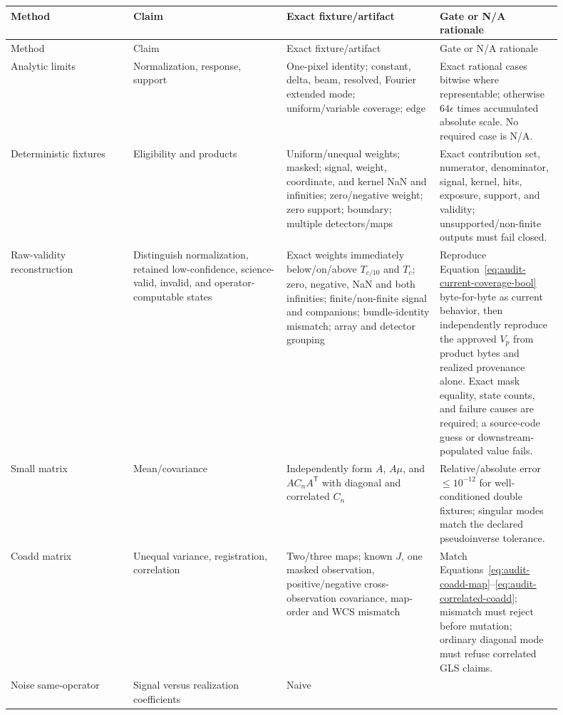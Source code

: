\documentclass[11pt]{article}
\begin{document}
\begin{longtable}{L{0.20\linewidth}L{0.25\linewidth}L{0.25\linewidth}L{0.20\linewidth}}
\toprule
Method & Claim & Exact fixture/artifact & Gate or N/A rationale\\
\midrule
\endfirsthead
\toprule
Method & Claim & Exact fixture/artifact & Gate or N/A rationale\\
\midrule
\endhead
Analytic limits & Normalization, response, support & One-pixel identity;
constant, delta, beam, resolved, Fourier extended mode; uniform/variable
coverage; edge & Exact rational cases bitwise where representable; otherwise
\(64\epsilon\) times accumulated absolute scale.  No required case is N/A.\\
Deterministic fixtures & Eligibility and products & Uniform/unequal weights;
masked; signal, weight, coordinate, and kernel NaN and infinities; zero/negative
weight; zero support; boundary; multiple detectors/maps & Exact contribution
set, numerator, denominator, signal, kernel, hits, exposure, support, and validity;
unsupported/non-finite outputs must fail closed.\\
Raw-validity reconstruction & Distinguish normalization, retained
low-confidence, science-valid, invalid, and operator-computable states & Exact
weights immediately below/on/above \(T_{c/10}\) and \(T_c\); zero, negative,
NaN and both infinities; finite/non-finite signal and companions; bundle-identity
mismatch; array and detector grouping & Reproduce
Equation~\eqref{eq:audit-current-coverage-bool} byte-for-byte as current
behavior, then independently reproduce the approved \(V_p\) from product bytes
and realized provenance alone.  Exact mask equality, state counts, and failure
causes are required; a source-code guess or downstream-populated value fails.\\
Small matrix & Mean/covariance & Independently form \(A\), \(A\mu\), and
\(AC_nA^{\mathsf T}\) with diagonal and correlated \(C_n\) & Relative/absolute
error \(\le 10^{-12}\) for well-conditioned double fixtures; singular modes
match the declared pseudoinverse tolerance.\\
Coadd matrix & Unequal variance, registration, correlation & Two/three maps;
known \(J\), one masked observation, positive/negative cross-observation
covariance, map-order and WCS mismatch & Match
Equations~\eqref{eq:audit-coadd-map}--\eqref{eq:audit-correlated-coadd}; mismatch
must reject before mutation; ordinary diagonal mode must refuse correlated GLS
claims.\\
Noise same-operator & Signal versus realization coefficients & Naive

\end{longtable}
\end{document}

